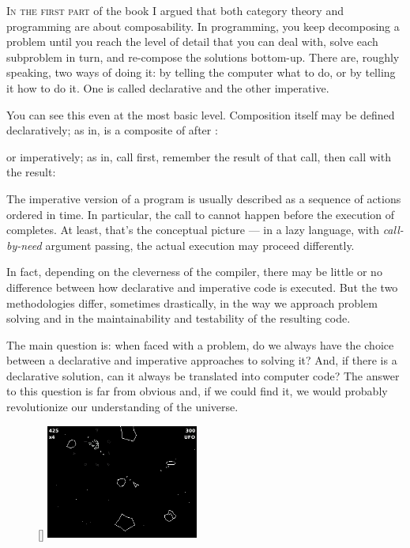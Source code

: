 
\lettrine[lhang=0.17]{I}{n the first part} of the book I argued that both category theory and
programming are about composability. In programming, you keep
decomposing a problem until you reach the level of detail that you can
deal with, solve each subproblem in turn, and re-compose the solutions
bottom-up. There are, roughly speaking, two ways of doing it: by telling
the computer what to do, or by telling it how to do it. One is called
declarative and the other imperative.

You can see this even at the most basic level. Composition itself may be
defined declaratively; as in,  is a composite of 
after :

or imperatively; as in, call  first, remember the result of
that call, then call  with the result:

The imperative version of a program is usually described as a sequence
of actions ordered in time. In particular, the call to  cannot
happen before the execution of  completes. At least, that's
the conceptual picture --- in a lazy language, with \emph{call-by-need}
argument passing, the actual execution may proceed differently.

In fact, depending on the cleverness of the compiler, there may be
little or no difference between how declarative and imperative code is
executed. But the two methodologies differ, sometimes drastically, in
the way we approach problem solving and in the maintainability and
testability of the resulting code.

The main question is: when faced with a problem, do we always have the
choice between a declarative and imperative approaches to solving it?
And, if there is a declarative solution, can it always be translated
into computer code? The answer to this question is far from obvious and,
if we could find it, we would probably revolutionize our understanding
of the universe.

\begin{figure}
\raisebox{0pt}[\dimexpr{}\baselineskip\relax]{
\includegraphics[width=50mm]{images/asteroids.png}}
\end{figure}

